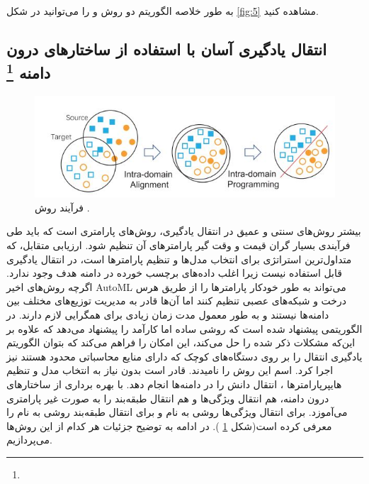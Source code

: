 {{{	 	به طور خلاصه الگوریتم دو روش 
	 	و
	 	را می‌توانید در شکل
	 	\ref{fig:5}
	 	 مشاهده کنید.
	 		
	 	}
	}

	\subsection{انتقال یادگیری آسان با استفاده از ساختارهای درون دامنه
		\protect \footnote{}}
	{
		\begin{figure}
			\centering
			\includegraphics[scale=0.6]{images/easyTL.JPG}
			\caption{ فرآیند روش 
				.  }
			\label{fig:6}
		\end{figure}
		بیشتر روش‌های سنتی و عمیق در انتقال یادگیری، روش‌های پارامتری است که باید طی فرآیندی بسیار گران قیمت و وقت گیر پارامترهای آن تنظیم شود. ارزیابی متقابل، که متداول‌ترین استراتژی برای انتخاب مدل‌ها و تنظیم پارامترها است، در انتقال یادگیری قابل استفاده نیست زیرا اغلب داده‌های برچسب خورده در دامنه هدف وجود ندارد. اگرچه روش‌های اخیر AutoML می‌تواند به طور خودکار پارامترها را از طریق هرس درخت و شبکه‌های عصبی تنظیم کنند اما آن‌ها قادر به مدیریت توزیع‌های مختلف بین دامنه‌ها نیستند و به طور معمول مدت زمان زیادی برای همگرایی لازم دارند. در 
		\cite{wang2019easy}
		الگوریتمی پیشنهاد شده است که روشی ساده اما کارآمد را پیشنهاد می‌دهد که علاوه بر این‌که مشکلات ذکر شده را حل می‌کند، این امکان را فراهم می‌کند که بتوان الگوریتم یادگیری انتقال را بر روی دستگاه‌های کوچک که دارای منایع محاسباتی محدود هستند نیز اجرا کرد. اسم این روش را
		نامیدند.
		قادر است بدون نیاز به انتخاب مدل و تنظیم هایپرپارامترها ، انتقال دانش را در دامنه‌ها انجام دهد.
		با بهره برداری از ساختارهای درون دامنه، هم انتقال ویژگی‌ها و هم انتقال طبقه‌بند را به صورت غیر پارامتری می‌آموزد. برای انتقال ویژگی‌ها روشی به نام
		و برای انتقال طبقه‌بند روشی به نام
		را معرفی کرده است(شکل 
		\ref{fig:6}
		). در ادامه به توضیح جزئیات هر کدام از این روش‌ها می‌پردازیم.
		
}}
